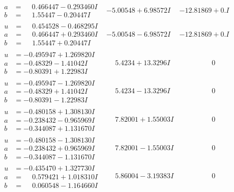 \documentclass[1p]{elsarticle_modified}
\theoremstyle{definition}
\begin{document}
$$\begin{array}{c|c|c}
\begin{aligned}
a &= \phantom{-}0.466447 - 0.293460 I \\
b &= \phantom{-}1.55447 - 0.20447 I\end{aligned}
 & -5.00548 + 6.98572 I & -12.81869 + 0. I\phantom{ +0.000000I} \\ \hline\begin{aligned}
u &= \phantom{-}0.454528 - 0.468295 I \\
a &= \phantom{-}0.466447 + 0.293460 I \\
b &= \phantom{-}1.55447 + 0.20447 I\end{aligned}
 & -5.00548 - 6.98572 I & -12.81869 + 0. I\phantom{ +0.000000I} \\ \hline\begin{aligned}
u &= -0.495947 + 1.269820 I \\
a &= -0.48329 - 1.41042 I \\
b &= -0.80391 + 1.22983 I\end{aligned}
 & \phantom{-}5.4234 + 13.3296 I & \phantom{-0.000000 } 0 \\ \hline\begin{aligned}
u &= -0.495947 - 1.269820 I \\
a &= -0.48329 + 1.41042 I \\
b &= -0.80391 - 1.22983 I\end{aligned}
 & \phantom{-}5.4234 - 13.3296 I & \phantom{-0.000000 } 0 \\ \hline\begin{aligned}
u &= -0.480158 + 1.308130 I \\
a &= -0.238432 - 0.965969 I \\
b &= -0.344087 + 1.131670 I\end{aligned}
 & \phantom{-}7.82001 + 1.55003 I & \phantom{-0.000000 } 0 \\ \hline\begin{aligned}
u &= -0.480158 - 1.308130 I \\
a &= -0.238432 + 0.965969 I \\
b &= -0.344087 - 1.131670 I\end{aligned}
 & \phantom{-}7.82001 - 1.55003 I & \phantom{-0.000000 } 0 \\ \hline\begin{aligned}
u &= -0.435470 + 1.327730 I \\
a &= \phantom{-}0.579421 + 1.018310 I \\
b &= \phantom{-}0.060548 - 1.164660 I\end{aligned}
 & \phantom{-}5.86004 - 3.19383 I & \phantom{-0.000000 } 0 \\ \hline\begin{aligned}

\end{aligned}
\end{array}$$
\end{document}
